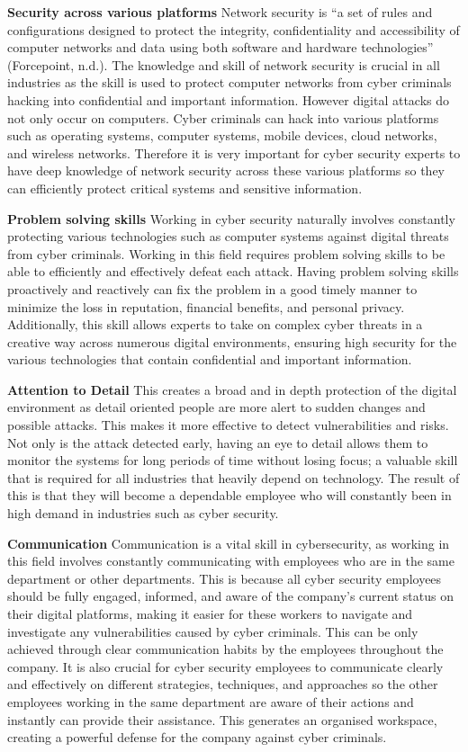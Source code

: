 \documentclass[a4paper, 11pt]{report}
\begin{document}
\textbf{Security across various platforms}
Network security is “a set of rules and configurations designed to protect the integrity, confidentiality and accessibility of computer networks and data using both software and hardware technologies” (Forcepoint, n.d.). The knowledge and skill of network security is crucial in all industries as the skill is used to protect computer networks from cyber criminals hacking into confidential and important information. However digital attacks do not only occur on computers. Cyber criminals can hack into various platforms such as operating systems, computer systems, mobile devices, cloud networks, and wireless networks. Therefore it is very important for cyber security experts to have deep knowledge of network security across these various platforms so they can efficiently protect critical systems and sensitive information. 

\textbf{Problem solving skills}
Working in cyber security naturally involves constantly protecting various technologies such as computer systems against digital threats from cyber criminals. Working in this field requires problem solving skills to be able to efficiently and effectively defeat each attack. Having problem solving skills proactively and reactively can fix the problem in a good timely manner to minimize the loss in reputation, financial benefits, and personal privacy. Additionally, this skill allows experts to take on complex cyber threats in a creative way across numerous digital environments, ensuring high security for the various technologies that contain confidential and important information. 

\textbf{Attention to Detail}
This creates a broad and in depth protection of the digital environment as detail oriented people are more alert to sudden changes and possible attacks. This  makes it more effective to detect vulnerabilities and risks. Not only is the attack detected early, having an eye to detail allows them to monitor the systems for long periods of time without losing focus; a valuable skill that is required for all industries that heavily depend on technology. The result of this is that they will become a dependable employee who will constantly been in high demand in industries such as cyber security. 

\textbf{Communication}
Communication is a vital skill in cybersecurity, as working in this field involves constantly communicating with employees who are in the same department or other departments. This is because all cyber security employees should be fully engaged, informed, and aware of the company's current status on their digital platforms, making it easier for these workers to navigate and investigate any vulnerabilities caused by cyber criminals. This can be only achieved through clear communication habits by the employees throughout the company. It is also crucial for cyber security employees to communicate clearly and effectively on different strategies, techniques, and approaches so the other employees working in the same department are aware of their actions and instantly can provide their assistance. This generates an organised workspace, creating a powerful defense for the company against cyber criminals. 
\end{document}
